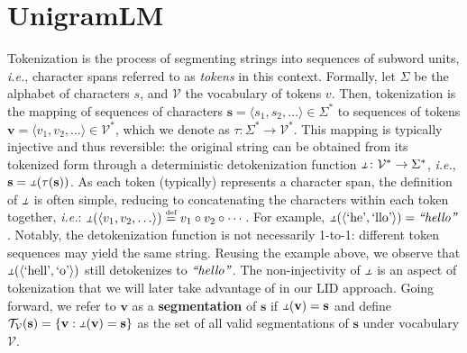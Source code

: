 \documentclass{article}
\makeatletter
\newcommand{\ie}{\emph{i.e.}\@\xspace}
\newcommand{\chspan}[1]{\text{\rmfamily\textit{``#1''}}\xspace}
\newcommand{\tokenprint}[1]{\text{`#1'}}
\newcommand{\note}[4][]{\todo[author=#2,color=#3,size=\scriptsize,fancyline,caption={},#1]{#4}} %
\newcommand{\pietro}[2][]{\note[#1]{pietro}{green!40}{#2}}
\newcommand{\defn}[1]{\textbf{#1}}
\newcommand{\defeq}{\mathrel{\stackrel{\textnormal{\tiny def}}{=}}}
\newcommand{\token}{v}
\newcommand{\stringunit}{s}
\newcommand{\str}{\mathbf{\stringunit}}
\newcommand{\tokens}{\mathbf{\token}}
\newcommand{\stralphabet}{\Sigma}
\newcommand{\vocab}{\mathcal{V}}
\newcommand{\detokfunc}{\ensuremath{\rotatebox[origin=c]{180}{$\tokfunc$}}}
\newcommand{\tokfunc}{\tau}
\newcommand{\allsegmentations}{\mathcal{T}}
\makeatother
\begin{document}
\section{UnigramLM}

Tokenization is the process of segmenting strings into sequences of subword units, \ie, character spans referred to as \emph{tokens} in this context. %
Formally, let $\stralphabet$ be the alphabet of characters $\stringunit$, and $\vocab$ the vocabulary of tokens $\token$. 
Then, tokenization is the mapping of sequences of characters $\str=\langle \stringunit_1,\stringunit_2,\dots\rangle \in\stralphabet^*$ to sequences of tokens 
$\tokens=\langle \token_1,\token_2,\dots\rangle\in\vocab^*$, which we denote as 
$\tokfunc\colon \stralphabet^* \rightarrow \vocab^*$. This mapping is typically injective and thus reversible: the original string can be obtained from its tokenized form through a deterministic detokenization function $\detokfunc\colon \vocab^* \rightarrow \stralphabet^*$, \ie, $\str=\detokfunc(\tokfunc(\str))$. As each token (typically) represents a character span, the definition of $\detokfunc$ is often simple, reducing to concatenating the characters within each token together, \ie: $\detokfunc(\langle\token_1, \token_2, \ldots\rangle) \defeq \token_1 \circ \token_2 \circ \cdots$. 
For example, $\detokfunc(\langle\tokenprint{he},\tokenprint{llo}\rangle) = \chspan{hello}$. Notably, the detokenization function is not necessarily 1-to-1: different token sequences may yield the same string. Reusing the example above, we observe that $\detokfunc(\langle\tokenprint{hell},\tokenprint{o}\rangle)$ still detokenizes to $\chspan{hello}$.
The non-injectivity of $\detokfunc$ is an aspect of tokenization that we will later take advantage of in our LID approach. 
Going forward, we refer to $\tokens$ as a \defn{segmentation} of $\str$ if $\detokfunc(\tokens) = \str$ and define $\allsegmentations_{\vocab}(\str) = \{\tokens : \detokfunc(\tokens) = \str\}$ as the set of all valid segmentations of $\str$ under vocabulary $\vocab$.
\end{document}

